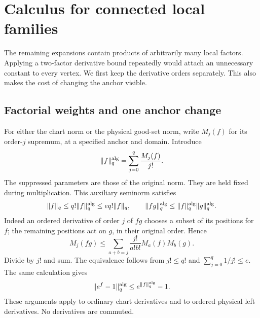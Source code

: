 \documentclass[11pt,reqno]{amsart}
\numberwithin{equation}{section}
\theoremstyle{definition}
\theoremstyle{remark}
\begin{document}
\section{Calculus for connected local families}
\label{sec:connected-local-calculus}

The remaining expansions contain products of arbitrarily
many local factors. Applying a two-factor derivative bound
repeatedly would attach an unnecessary constant to every
vertex. We first keep the derivative orders separately.
This also makes the cost of changing the anchor visible.

\subsection{Factorial weights and one anchor change}

For either the chart norm or the physical good-set norm,
write \(M_j(f)\) for its order-\(j\) supremum, at a
specified anchor and domain. Introduce
\begin{equation}
               \|f\|^{\rm alg}_q
                      =\sum_{j=0}^q\frac{M_j(f)}{j!}.
 \label{eq:connected-algebra-norm}
\end{equation}
The suppressed parameters are those of the original norm.
They are held fixed during multiplication.
This auxiliary seminorm satisfies
\begin{equation}
 \|f\|_q\le q!\|f\|^{\rm alg}_q
       \le e q!\|f\|_q,\qquad
 \|fg\|^{\rm alg}_q\le
                  \|f\|^{\rm alg}_q\|g\|^{\rm alg}_q .
 \label{eq:connected-algebra-product}
\end{equation}
Indeed an ordered derivative of order \(j\) of \(fg\)
chooses a subset of its positions for \(f\); the
remaining positions act on \(g\), in their original
order. Hence
\[
        M_j(fg)\le
          \sum_{a+b=j}\frac{j!}{a!b!}M_a(f)M_b(g).
\]
Divide by \(j!\) and sum. The equivalence follows from
\(j!\le q!\) and \(\sum_{j=0}^q1/j!\le e\).
The same calculation gives
\begin{equation}
              \|e^f-1\|^{\rm alg}_q
                         \le e^{\|f\|^{\rm alg}_q}-1 .
 \label{eq:connected-algebra-exponential}
\end{equation}
These arguments apply to ordinary chart derivatives
and to ordered physical left derivatives.
No derivatives are commuted.
\end{document}
